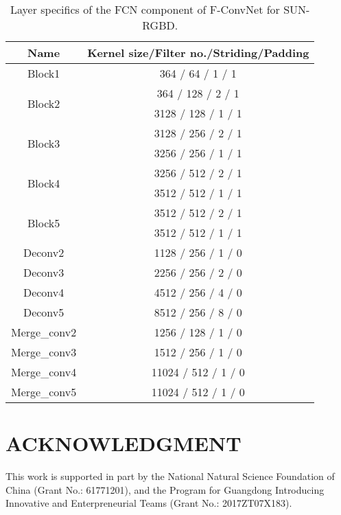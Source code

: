 \documentclass[letterpaper, 10 pt, conference]{ieeeconf}
\begin{document}
\begin{table}[h]
	\begin{center}
	\begin{tabular}{c|c}
		\hline
		Name                    & Kernel size/Filter no./Striding/Padding \\ \hline
		Block1                  & 364 / 64  / 1 / 1               \\
		\hline
		\multirow{2}{*}{Block2} & 364 / 128  / 2 / 1              \\
		                        & 3128 / 128 / 1 / 1              \\
		\hline
		\multirow{2}{*}{Block3} & 3128 / 256 / 2 / 1              \\
		                        & 3256 / 256 / 1 / 1              \\
		\hline
		\multirow{2}{*}{Block4} & 3256 / 512 / 2 / 1              \\
		                        & 3512 / 512 / 1 / 1              \\
		\hline
		\multirow{2}{*}{Block5} & 3512 / 512 / 2 / 1              \\
		                        & 3512 / 512 / 1 / 1              \\
		\hline
		Deconv2                 & 1128 / 256 / 1 / 0              \\
		Deconv3                 & 2256 / 256 / 2 / 0              \\
		Deconv4                 & 4512 / 256 / 4 / 0              \\
		Deconv5                 & 8512 / 256 / 8 / 0              \\
		\hline
		Merge\_conv2            & 1256 / 128 / 1 / 0              \\
		Merge\_conv3            & 1512 / 256 / 1 / 0              \\
		Merge\_conv4            & 11024 / 512 / 1 / 0             \\
		Merge\_conv5            & 11024 / 512 / 1 / 0             \\
		\hline
	\end{tabular}
	\caption{Layer specifics of the FCN component of F-ConvNet for SUN-RGBD. }
	\label{Tab:SUNRGBD_SPECIFICS}
	\end{center}
	\vspace{-0.5cm}
\end{table}




\section*{ACKNOWLEDGMENT}
This work is supported in part by the National Natural Science Foundation of China (Grant No.: 61771201), and the Program for Guangdong Introducing Innovative and Enterpreneurial Teams (Grant No.: 2017ZT07X183).



\end{document}
